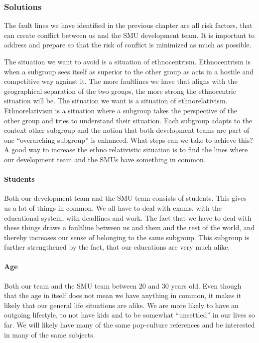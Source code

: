 \documentclass[a4paper,11pt,report]{article}
\begin{document}
\subsubsection{Solutions}
The fault lines we have identified in the previous chapter are all risk factors, that can create conflict between us and the SMU development team. It is important to address and prepare so that the risk of conflict is minimized as much as possible.

The situation we want to avoid is a situation of ethnocentrism. Ethnocentrism is when a subgroup sees itself as superior to the other group as acts in a hostile and competitive way against it. The more faultlines we have that aligns with the geographical separation of the two groups, the more strong the ethnocentric situation will be. The situation we want is a situation of ethnorelativism\cite{smu}. Ethnorelativism is a situation where a subgroup takes the perspective of the other group and tries to understand their situation. Each subgroup adapts to the context other subgroup and the notion that both development teams are part of one “overarching subgroup” is enhanced. What steps can we take to achieve this?\\

A good way to increase the ethno relativistic situation is to find the lines where our development team and the SMUs have something in common. \\

\paragraph{Students}
Both our development team and the SMU team consists of students. This gives us a lot of things in common. We all have to deal with exams, with the educational system, with deadlines and work. The fact that we have to deal with these things draws a faultline between us and them and the rest of the world, and thereby increases our sense of belonging to the same subgroup. This subgroup is further strengthened by the fact, that our educations are very much alike. \\

\paragraph{Age}
Both our team and the SMU team between 20 and 30 years old. Even though that the age in itself does not mean we have anything in common, it makes it likely that our general life situations are alike. We are more likely to have an outgoing lifestyle, to not have kids and to be somewhat “unsettled” in our lives so far. We will likely have many of the same pop-culture references and be interested in many of the same subjects. 
\end{document}
